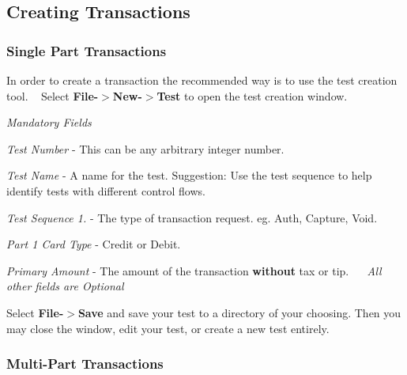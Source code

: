 \subsection*{Creating Transactions}

\subsubsection*{Single Part Transactions}

In order to create a transaction the recommended way is to use the test creation tool. ~\newline
 Select {\bfseries File-\/$>$New-\/$>$Test} to open the test creation window. ~\newline




{\itshape Mandatory Fields}~\newline

\begin{DoxyItemize}
\item {\itshape Test Number} -\/ This can be any arbitrary integer number.~\newline

\item {\itshape Test Name} -\/ A name for the test. Suggestion\+: Use the test sequence to help identify tests with different control flows.~\newline

\item {\itshape Test Sequence 1.} -\/ The type of transaction request. eg. Auth, Capture, Void.~\newline

\item {\itshape Part 1 Card Type} -\/ Credit or Debit.~\newline

\item {\itshape Primary Amount} -\/ The amount of the transaction {\bfseries without} tax or tip.~\newline
 ~\newline
 {\itshape All other fields are Optional}
\end{DoxyItemize}

Select {\bfseries File-\/$>$Save} and save your test to a directory of your choosing. Then you may close the window, edit your test, or create a new test entirely.

\subsubsection*{Multi-\/\+Part Transactions}

